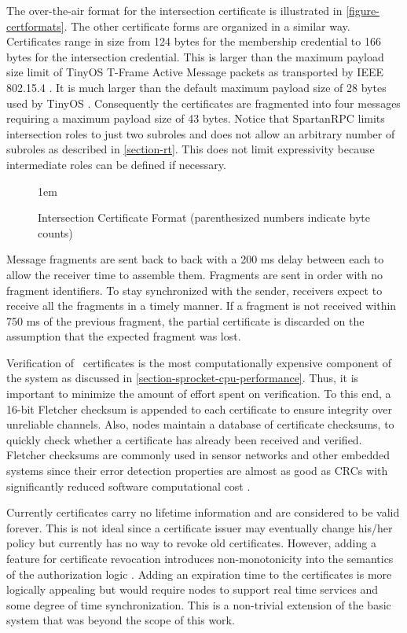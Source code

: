The over-the-air format for the intersection certificate is illustrated in
\autoref{figure-certformats}. The other certificate forms are organized in a similar way.
Certificates range in size from 124 bytes for the membership credential to 166 bytes for the
intersection credential. This is larger than the maximum payload size limit of TinyOS T-Frame
Active Message packets as transported by IEEE 802.15.4 \cite{802.15.4,hui-tep125}. It is much
larger than the default maximum payload size of 28 bytes used by TinyOS \cite{levis-tep111}.
Consequently the certificates are fragmented into four messages requiring a maximum payload size
of 43 bytes. Notice that SpartanRPC limits intersection roles to just two subroles and does not
allow an arbitrary number of subroles as described in \autoref{section-rt}. This does not limit
expressivity because intermediate roles can be defined if necessary.

\begin{figure}[t]
  
  \centerline{\raise 1em\box\graph}
  \vspace{2mm}
  \caption{Intersection Certificate Format (parenthesized numbers indicate byte counts)}
  \label{figure-certformats}
\end{figure}

Message fragments are sent back to back with a 200 ms delay between each to allow the receiver
time to assemble them. Fragments are sent in order with no fragment identifiers. To stay
synchronized with the sender, receivers expect to receive all the fragments in a timely manner.
If a fragment is not received within 750 ms of the previous fragment, the partial certificate is
discarded on the assumption that the expected fragment was lost.

Verification of \RT\ certificates is the most computationally expensive component of the system
as discussed in \autoref{section-sprocket-cpu-performance}. Thus, it is important to minimize
the amount of effort spent on verification. To this end, a 16-bit Fletcher checksum is appended
to each certificate to ensure integrity over unreliable channels. Also, nodes maintain a
database of certificate checksums, to quickly check whether a certificate has already been
received and verified. Fletcher checksums are commonly used in sensor networks and other
embedded systems since their error detection properties are almost as good as CRCs with
significantly reduced software computational cost \cite{fletcher-1982}.

Currently certificates carry no lifetime information and are considered to be valid forever.
This is not ideal since a certificate issuer may eventually change his/her policy but currently
has no way to revoke old certificates. However, adding a feature for certificate revocation
introduces non-monotonicity into the semantics of the authorization logic
\cite{Li01nonmonotonicity,Rivest:1998:WEC:647502.728327}. Adding an expiration time to the
certificates is more logically appealing but would require nodes to support real time services
and some degree of time synchronization. This is a non-trivial extension of the basic system
that was beyond the scope of this work.

